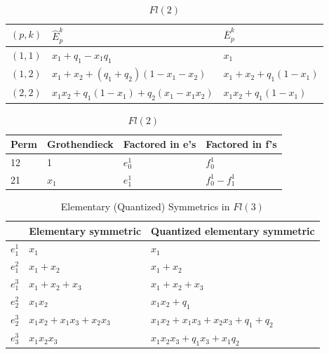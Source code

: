 \documentclass[11pt]{article}
\begin{document}
\begin{table}[!h]
\centering
\caption{$Fl(2)$}
\begin{tabular}{|p{1cm}|p{6cm}|p{5cm}|}
\hline
$(p, k)$& \textbf{$\hat{E}_p^k$} & \textbf{$\overline{E}_p^k$} \\ \hline 
$(1, 1)$ & $x_1 + q_1 - x_1q_1$ & $x_1$ \\ \hline
$(1, 2)$ & $x_1 + x_2 + (q_1 + q_2)(1- x_1 - x_2)$ & $x_1 + x_2 + q_1(1 - x_1)$ \\ \hline 
$(2, 2)$ & $x_1x_2  + q_1(1 - x_1) + q_2(x_1 - x_1x_2)$ & $x_1x_2 + q_1 (1 - x_1)$  \\ \hline 
\end{tabular}
\end{table}

\begin{table}[!h]
\centering
\caption{$Fl(2)$}
\begin{tabular}{|p{2cm}|p{2.5cm}|p{6cm}|p{6cm}|}
\hline
\textbf{Perm} & \textbf{Grothendieck} & \textbf{Factored in e's} & \textbf{Factored in f's} \\ \hline
12 & 1 & $e_0^1$ & $f_0^1$ \\ \hline
21 & $x_1$ & $e_1^1$ & $f_0^1 - f_1^1$ \\ \hline
\end{tabular}
\end{table}

\newpage

\begin{table}[!h]
\centering
\caption{Elementary (Quantized) Symmetrics in $Fl(3)$}
\begin{tabular}{|p{1cm}|p{4cm}|p{6cm}|}
\hline
& \textbf{Elementary symmetric} & \textbf{Quantized elementary symmetric} \\ \hline 
$e_1^1$ & $x_1$ & $x_1$ \\ \hline
$e_1^2$ & $x_1 + x_2$ & $x_1 + x_2$ \\ \hline 
$e_1^3$ & $x_1 + x_2 + x_3$ & $x_1 + x_2 + x_3$ \\ \hline 
$e_2^2$ & $x_1x_2$ & $x_1x_2 + q_1$ \\ \hline 
$e_2^3$ & $x_1x_2 + x_1x_3 + x_2x_3$ &  $x_1x_2 + x_1x_3 + x_2x_3 + q_1 + q_2$\\ \hline 
$e_3^3$ & $x_1x_2x_3$ & $x_1x_2x_3 + q_1x_3 + x_1q_2$ \\ \hline
\end{tabular}
\end{table}
\end{document}
